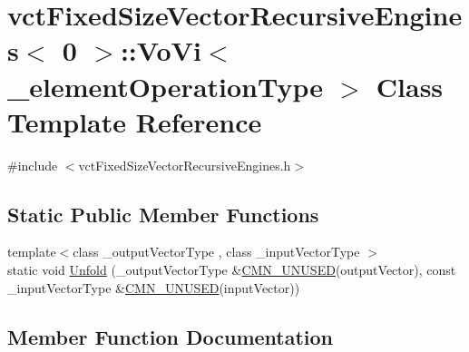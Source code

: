 \hypertarget{classvct_fixed_size_vector_recursive_engines_3_010_01_4_1_1_vo_vi}{}\section{vct\+Fixed\+Size\+Vector\+Recursive\+Engines$<$ 0 $>$\+:\+:Vo\+Vi$<$ \+\_\+element\+Operation\+Type $>$ Class Template Reference}
\label{classvct_fixed_size_vector_recursive_engines_3_010_01_4_1_1_vo_vi}


{\ttfamily \#include $<$vct\+Fixed\+Size\+Vector\+Recursive\+Engines.\+h$>$}

\subsection*{Static Public Member Functions}
\begin{DoxyCompactItemize}
\item 
{\footnotesize template$<$class \+\_\+output\+Vector\+Type , class \+\_\+input\+Vector\+Type $>$ }\\static void \hyperlink{classvct_fixed_size_vector_recursive_engines_3_010_01_4_1_1_vo_vi_ac7f44929379177242a01e555560d504d}{Unfold} (\+\_\+output\+Vector\+Type \&\hyperlink{cmn_portability_8h_a021894e2626935fa2305434b1e893ff6}{C\+M\+N\+\_\+\+U\+N\+U\+S\+E\+D}(output\+Vector), const \+\_\+input\+Vector\+Type \&\hyperlink{cmn_portability_8h_a021894e2626935fa2305434b1e893ff6}{C\+M\+N\+\_\+\+U\+N\+U\+S\+E\+D}(input\+Vector))
\end{DoxyCompactItemize}


\subsection{Member Function Documentation}
\hypertarget{classvct_fixed_size_vector_recursive_engines_3_010_01_4_1_1_vo_vi_ac7f44929379177242a01e555560d504d}{}
